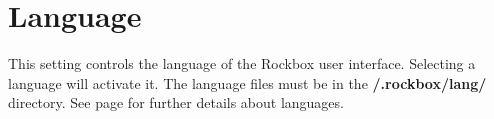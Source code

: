 \section{\label{ref:Language}Language}
  This setting controls the language of the Rockbox user interface. Selecting a language will activate it. The language files must be in the \textbf{/.rockbox/lang/} directory. See page \pageref{ref:Loadinglanguages} for further details about languages.

